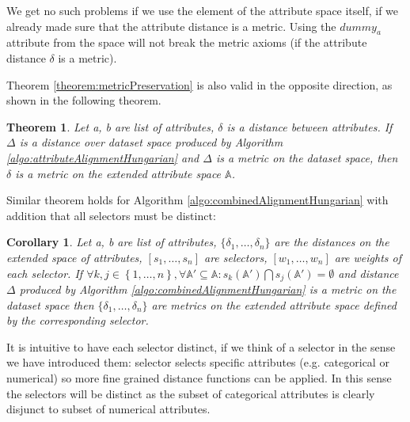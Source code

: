 \documentclass{article}
\newtheorem{corollary}{Corollary}
\newtheorem{theorem}{Theorem}
\newcommand{\attributeDistance}{\delta}
\newcommand{\globalDistance}{\Delta}
\newcommand{\dummyinside}{dummy_a}
\begin{document}
\begin{refsegment}
We get no such problems if we use the element of the attribute space itself, if we already made sure that the attribute distance is a metric. Using the $\dummyinside$ attribute from the space will not break the metric axioms (if the attribute distance $\attributeDistance$ is a metric).

Theorem \ref{theorem:metricPreservation} is also valid in the opposite direction, as shown in the following theorem.
\begin{theorem}
	\label{theorem:metricRestoration}
	Let a, b are list of attributes, $\attributeDistance$ is a distance between attributes. If $\globalDistance$ is a distance over dataset space produced by Algorithm \ref{algo:attributeAlignmentHungarian} and $\globalDistance$ is a metric on the dataset space, then $\attributeDistance$ is a metric on the extended attribute space $\mathbb{A}$.
\end{theorem}

Similar theorem holds for Algorithm \ref{algo:combinedAlignmentHungarian} with addition that all selectors must be distinct:
\begin{corollary}
	\label{corollary:metricRestoration}
	Let a, b are list of attributes, $\{\attributeDistance_1, \dots, \attributeDistance_n\}$ are the distances on the extended space of attributes, $[s_1, \dots, s_n]$ are selectors, $[w_1, \dots, w_n]$ are weights of each selector. If $\forall k,j \in \left\{1, \dots, n\right\}, \forall \mathbb{A'} \subseteq \mathbb{A}:s_k(\mathbb{A'})\bigcap s_j(\mathbb{A'})= \emptyset$ and distance $\globalDistance$ produced by Algorithm \ref{algo:combinedAlignmentHungarian} is a metric on the dataset space then $\{\attributeDistance_1, \dots, \attributeDistance_n\}$ are metrics on the extended attribute space defined by the corresponding selector.	
\end{corollary}
It is intuitive to have each selector distinct, if we think of a selector in the sense we have introduced them: selector selects specific attributes (e.g. categorical or numerical) so more fine grained distance functions can be applied. In this sense the selectors will be distinct as the subset of categorical attributes is clearly disjunct to subset of numerical attributes.


\end{refsegment}
\end{document}
